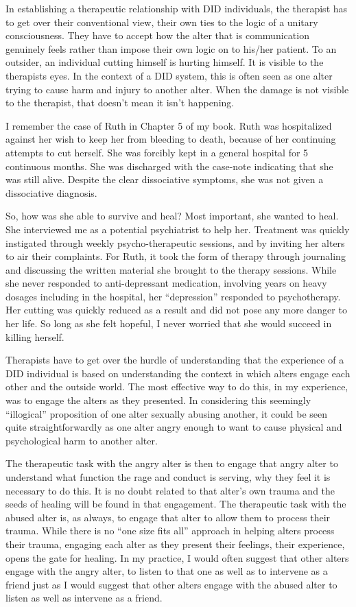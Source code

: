 \documentclass[]{book}
\begin{document}
In establishing a therapeutic relationship with DID individuals, the therapist has to get over their conventional view, their own ties to the logic of a unitary consciousness. They have to accept how the alter that is communication genuinely feels rather than impose their own logic on to his/her patient. To an outsider, an individual cutting himself is hurting himself. It is visible to the therapists eyes. In the context of a DID system, this is often seen as one alter trying to cause harm and injury to another alter. When the damage is not visible to the therapist, that doesn't mean it isn't happening.

I remember the case of Ruth in Chapter 5 of my book. Ruth was hospitalized against her wish to keep her from bleeding to death, because of her continuing attempts to cut herself. She was forcibly kept in a general hospital for 5 continuous months. She was discharged with the case-note indicating that she was still alive. Despite the clear dissociative symptoms, she was not given a dissociative diagnosis.

So, how was she able to survive and heal? Most important, she wanted to heal. She interviewed me as a potential psychiatrist to help her. Treatment was quickly instigated through weekly psycho-therapeutic sessions, and by inviting her alters to air their complaints. For Ruth, it took the form of therapy through journaling and discussing the written material she brought to the therapy sessions. While she never responded to anti-depressant medication, involving years on heavy dosages including in the hospital, her ``depression'' responded to psychotherapy. Her cutting was quickly reduced as a result and did not pose any more danger to her life. So long as she felt hopeful, I never worried that she would succeed in killing herself.

Therapists have to get over the hurdle of understanding that the experience of a DID individual is based on understanding the context in which alters engage each other and the outside world. The most effective way to do this, in my experience, was to engage the alters as they presented. In considering this seemingly ``illogical'' proposition of one alter sexually abusing another, it could be seen quite straightforwardly as one alter angry enough to want to cause physical and psychological harm to another alter.

The therapeutic task with the angry alter is then to engage that angry alter to understand what function the rage and conduct is serving, why they feel it is necessary to do this. It is no doubt related to that alter's own trauma and the seeds of healing will be found in that engagement. The therapeutic task with the abused alter is, as always, to engage that alter to allow them to process their trauma. While there is no ``one size fits all'' approach in helping alters process their trauma, engaging each alter as they present their feelings, their experience, opens the gate for healing. In my practice, I would often suggest that other alters engage with the angry alter, to listen to that one as well as to intervene as a friend just as I would suggest that other alters engage with the abused alter to listen as well as intervene as a friend.
\end{document}
